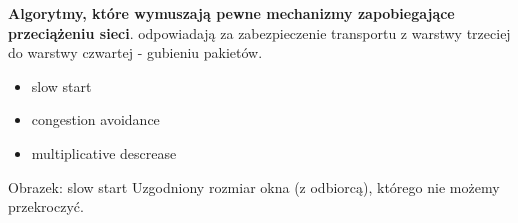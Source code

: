\documentclass[a4paper,twoside]{article}
\begin{document}
\textbf{Algorytmy, które wymuszają pewne mechanizmy zapobiegające przeciążeniu sieci}. odpowiadają za zabezpieczenie transportu z warstwy trzeciej do warstwy czwartej - gubieniu pakietów.
\begin{itemize}
	\item slow start
	\item congestion avoidance
	\item multiplicative descrease
\end{itemize}

Obrazek: slow start
Uzgodniony rozmiar okna (z odbiorcą), którego nie możemy przekroczyć.
\end{document}
